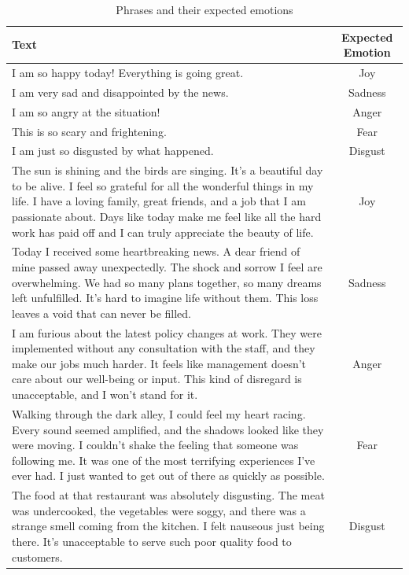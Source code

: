 \begin{table}[h!]
\centering{}
\caption{Phrases and their expected emotions}
\begin{tabular}{|p{9cm}|c|}
\hline
\textbf{Text} & \textbf{Expected Emotion} \\ \hline
I am so happy today! Everything is going great. & Joy \\ \hline
I am very sad and disappointed by the news. & Sadness \\ \hline
I am so angry at the situation! & Anger \\ \hline
This is so scary and frightening. & Fear \\ \hline
I am just so disgusted by what happened. & Disgust \\ \hline
The sun is shining and the birds are singing. It's a beautiful day to be alive. I feel so grateful for all the wonderful things in my life. I have a loving family, great friends, and a job that I am passionate about. Days like today make me feel like all the hard work has paid off and I can truly appreciate the beauty of life. & Joy \\ \hline
Today I received some heartbreaking news. A dear friend of mine passed away unexpectedly. The shock and sorrow I feel are overwhelming. We had so many plans together, so many dreams left unfulfilled. It's hard to imagine life without them. This loss leaves a void that can never be filled. & Sadness \\ \hline
I am furious about the latest policy changes at work. They were implemented without any consultation with the staff, and they make our jobs much harder. It feels like management doesn't care about our well-being or input. This kind of disregard is unacceptable, and I won't stand for it. & Anger \\ \hline
Walking through the dark alley, I could feel my heart racing. Every sound seemed amplified, and the shadows looked like they were moving. I couldn't shake the feeling that someone was following me. It was one of the most terrifying experiences I've ever had. I just wanted to get out of there as quickly as possible. & Fear \\ \hline
The food at that restaurant was absolutely disgusting. The meat was undercooked, the vegetables were soggy, and there was a strange smell coming from the kitchen. I felt nauseous just being there. It's unacceptable to serve such poor quality food to customers. & Disgust \\ \hline
\end{tabular}
\label{tab:phrases_emotions}
\end{table}
\clearpage{}

